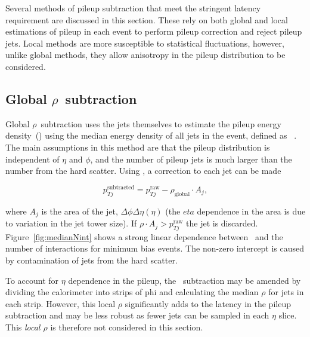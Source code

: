 Several methods of pileup subtraction that meet the stringent latency requirement
are discussed in this section. These rely on both global and local estimations of 
pileup in each event to perform pileup correction and reject pileup jets. 
Local methods are more susceptible to statistical fluctuations, however,
unlike global methods, they allow anisotropy in the 
pileup distribution to be considered.

\subsection{Global $\rho$~subtraction}

Global $\rho$~subtraction uses the jets themselves to estimate the pileup energy density~(\rhoP) using
the median energy density of all jets in the event, defined as \rhoG~\cite{jet_area}. 
The main assumptions in this method are that the pileup distribution is independent of $\eta$ and $\phi$,  
and the number of pileup jets is much larger than the number from the hard scatter. Using \rhoG, 
a correction to each jet can be made

\begin{equation}
\label{equ:global_rho}
p_{Tj}^{\text{subtracted}} = p_{Tj}^{\text{raw}} - \rho_{\text{global}} \cdot A_j,
\end{equation}


where $A_j$ is the area of the jet, $\Delta\phi\Delta\eta(\eta)$ (the $eta$ dependence in the area is due 
to variation in the jet tower size). If $\rho \cdot A_j > p_{Tj}^{\text{raw}}$ the jet is discarded. 
Figure~\ref{fig:medianNint} shows a strong linear dependence between \rhoG~and the number of interactions for
minimum bias events. The non-zero intercept is caused by contamination of jets from the hard scatter.

To account for $\eta$ dependence in the pileup, the \rhoG~subtraction may be amended by
dividing the calorimeter into strips of phi and calculating the median $\rho$ for jets in each 
strip. However, this local $\rho$ significantly adds to the latency in the pileup subtraction and may 
be less robust as fewer jets can be sampled in each $\eta$ slice. This \emph{local $\rho$} 
is therefore not considered in this section.

